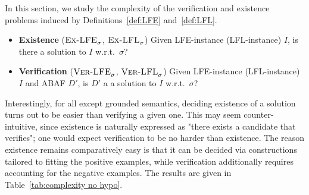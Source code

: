 \documentclass[letterpaper]{article} %
\newcommand{\VerLFE}[2]{\textsc{Ver-LFE}_{#1}^{#2}}
\newcommand{\VerLFL}[2]{\textsc{Ver-LFL}_{#1}^{#2}}
\newcommand{\ExLFE}[2]{\textsc{Ex-LFE}_{#1}^{#2}}
\newcommand{\ExLFL}[2]{\textsc{Ex-LFL}_{#1}^{#2}}
\begin{document}
In this section, we study the complexity of the verification and existence problems induced by Definitions~\ref{def:LFE} and~\ref{def:LFL}.
\begin{itemize}
    \item \textbf{Existence} ($\ExLFE{\sigma}{}$, $\ExLFL{\sigma}{}$) Given LFE-instance (LFL-instance) $I$, is there a solution to $I$ w.r.t.~$\sigma$?
    \item \textbf{Verification} ($\VerLFE{\sigma}{}$, $\VerLFL{\sigma}{}$) Given LFE-instance (LFL-instance) $I$ and ABAF $D'$, is $D'$ a a solution to $I$ w.r.t.\ $\sigma$?
\end{itemize}
Interestingly, for all except grounded semantics, deciding existence of a solution turns out to be easier than verifying a given one. 
This may seem counter-intuitive, since existence is naturally expressed as "there exists a candidate that verifies"; one would expect verification to be no harder than existence. The reason existence remains comparatively easy is that it can be decided via constructions tailored to fitting the positive examples, while verification additionally requires accounting for the negative examples.
%
The results are given in Table~\ref{tab:complexity no hypo}.%
\end{document}
